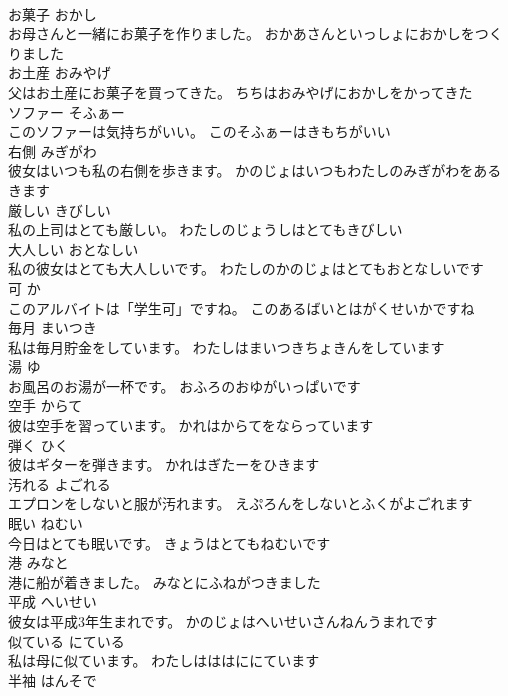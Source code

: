 \documentclass[8pt]{extreport}
\begin{document}
\begin{CJK}{UTF8}{min}
\\	お菓子	おかし	
\\	お母さんと一緒にお菓子を作りました。	おかあさんといっしょにおかしをつくりました	
\\	お土産	おみやげ	
\\	父はお土産にお菓子を買ってきた。	ちちはおみやげにおかしをかってきた	
\\	ソファー	そふぁー	
\\	このソファーは気持ちがいい。	このそふぁーはきもちがいい	
\\	右側	みぎがわ	
\\	彼女はいつも私の右側を歩きます。	かのじょはいつもわたしのみぎがわをあるきます	
\\	厳しい	きびしい	
\\	私の上司はとても厳しい。	わたしのじょうしはとてもきびしい	
\\	大人しい	おとなしい	
\\	私の彼女はとても大人しいです。	わたしのかのじょはとてもおとなしいです	
\\	可	か	
\\	このアルバイトは「学生可」ですね。	このあるばいとはがくせいかですね	
\\	毎月	まいつき	
\\	私は毎月貯金をしています。	わたしはまいつきちょきんをしています	
\\	湯	ゆ	
\\	お風呂のお湯が一杯です。	おふろのおゆがいっぱいです	
\\	空手	からて	
\\	彼は空手を習っています。	かれはからてをならっています	
\\	弾く	ひく	
\\	彼はギターを弾きます。	かれはぎたーをひきます	
\\	汚れる	よごれる	
\\	エプロンをしないと服が汚れます。	えぷろんをしないとふくがよごれます	
\\	眠い	ねむい	
\\	今日はとても眠いです。	きょうはとてもねむいです	
\\	港	みなと	
\\	港に船が着きました。	みなとにふねがつきました	
\\	平成	へいせい	
\\	彼女は平成3年生まれです。	かのじょはへいせいさんねんうまれです	
\\	似ている	にている	
\\	私は母に似ています。	わたしはははににています	
\\	半袖	はんそで	

\end{CJK}
\end{document}
